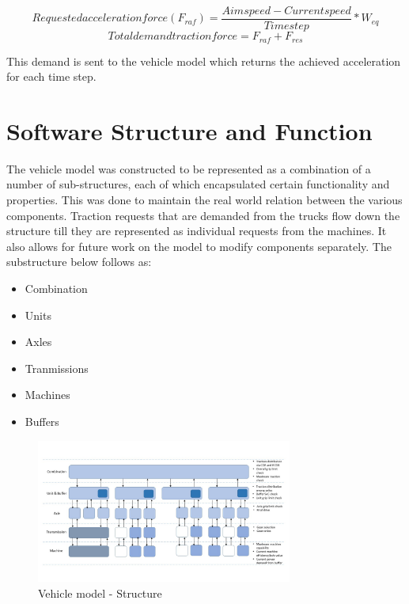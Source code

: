 \documentclass[ExampleMasters.tex]{subfiles}
\begin{document}
\begin{equation} \label{eq:reqacclforce}
Requested acceleration force(F_{raf}) =\frac {Aim speed- Current speed}{Time step}*W_{eq}
\end{equation}
\begin{equation} \label{eq:totdemforce}
Total demand traction force = F_{raf}+F_{res}
\end{equation}

This demand is sent to the vehicle model which returns the achieved acceleration for each time step.

\section{Software Structure and Function}
The vehicle model was constructed to be represented as a combination of a number of sub-structures, each of which encapsulated certain functionality and properties. This was done to maintain the real world relation between the various components. Traction requests that are demanded from the trucks flow down the structure till they are represented as individual requests from the machines. It also allows for future work on the model to modify components separately. The substructure below follows as:

\begin{itemize}
\item Combination
\item Units
\item Axles
\item Tranmissions
\item Machines
\item Buffers
\end{itemize}

\begin{figure}[ht!]
	\begin{center}
		\includegraphics[width=0.75\textwidth]{figures/VehicleModel/vehiclelayout.jpg}
	\end{center}
	\caption{Vehicle model - Structure}
	\label{fig:vehiclelayout}
\end{figure}
\end{document}
